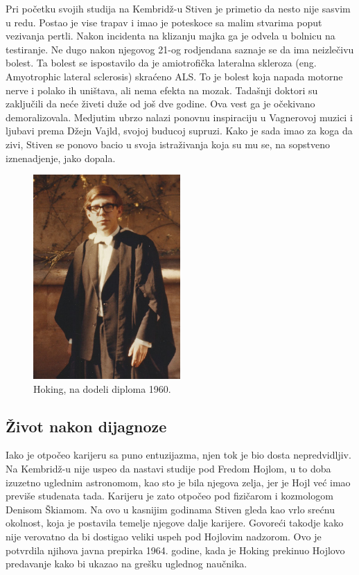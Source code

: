 \documentclass[a4paper, 12pt]{article}
\begin{document}
{Pri početku svojih studija na Kembridž-u Stiven je primetio da nesto nije sasvim u 
redu. Postao je vise trapav i imao je poteskoce sa malim stvarima poput vezivanja 
pertli. Nakon incidenta na klizanju majka ga je odvela u bolnicu na testiranje. Ne 
dugo nakon njegovog 21-og rodjendana saznaje se da ima neizlečivu bolest. Ta bolest 
se ispostavilo da je amiotrofička lateralna skleroza (eng. Amyotrophic lateral 
sclerosis) skraćeno ALS. To je bolest koja napada motorne nerve i polako ih uništava, 
ali nema efekta na mozak. Tadašnji doktori su zaključili da neće živeti duže od još 
dve godine. Ova vest ga je očekivano demoralizovala. Medjutim ubrzo nalazi ponovnu 
inspiraciju u Vagnerovoj muzici i ljubavi prema Džejn Vajld, svojoj buducoj supruzi. 
Kako je sada imao za koga da zivi, Stiven se ponovo bacio u svoja istraživanja koja 
su mu se, na sopstveno iznenadjenje, jako dopala. \cite{hawkingcom}

\begin{figure}[h!]
\centering
\includegraphics[width=0.5\textwidth]{Hoking,PreDijagnoze.jpg}
\caption{Hoking, na dodeli diploma 1960.}
\end{figure}

\subsection{Život nakon dijagnoze}
Iako je otpočeo karijeru sa puno entuzijazma, njen tok je bio dosta nepredvidljiv. 
Na Kembridž-u nije uspeo da nastavi studije pod Fredom Hojlom, u to doba izuzetno 
uglednim astronomom, kao sto je bila njegova zelja, jer je Hojl već imao previše 
studenata tada. Karijeru je zato otpočeo pod fizičarom i kozmologom Denisom Škiamom. 
Na ovo u kasnijim godinama Stiven gleda kao vrlo srećnu okolnost, koja je postavila 
temelje njegove dalje karijere. Govoreći takodje kako nije verovatno da bi dostigao 
veliki uspeh pod Hojlovim nadzorom. Ovo je potvrdila njihova javna prepirka 1964. 
godine, kada je Hoking prekinuo Hojlovo predavanje kako bi ukazao na grešku uglednog 
naučnika. \medskip \cite{kratkaistorija}
\newpage

}
\end{document}
